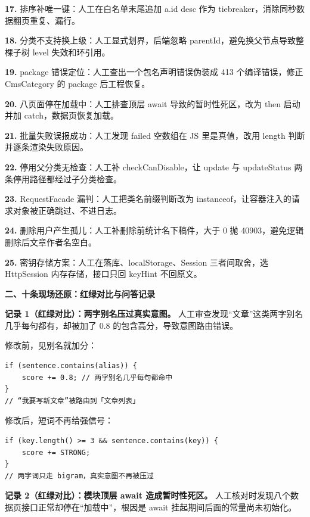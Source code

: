 \documentclass[zihao=-4,UTF8,openany]{ctexart}
\renewcommand{\_}{\textunderscore\allowbreak}
\begin{document}
\noindent\textbf{17.} 排序补唯一键：人工在白名单末尾追加 a.id desc 作为 tiebreaker，消除同秒数据翻页重复、漏行。

\noindent\textbf{18.} 分类不支持换上级：人工显式划界，后端忽略 parentId，避免换父节点导致整棵子树 level 失效和环引用。

\noindent\textbf{19.} package 错误定位：人工查出一个包名声明错误伪装成 413 个编译错误，修正 CmsCategory 的 package 后工程恢复。

\noindent\textbf{20.} 八页面停在加载中：人工排查顶层 await 导致的暂时性死区，改为 then 启动并加 catch，数据页恢复加载。

\noindent\textbf{21.} 批量失败误报成功：人工发现 failed 空数组在 JS 里是真值，改用 length 判断并逐条渲染失败原因。

\noindent\textbf{22.} 停用父分类无检查：人工补 checkCanDisable，让 update 与 updateStatus 两条停用路径都经过子分类检查。

\noindent\textbf{23.} RequestFacade 漏判：人工把类名前缀判断改为 instanceof，让容器注入的请求对象被正确跳过、不进日志。

\noindent\textbf{24.} 删除用户产生孤儿：人工补删除前统计名下稿件，大于 0 抛 40903，避免逻辑删除后文章作者名空白。

\noindent\textbf{25.} 密钥存储方案：人工在落库、localStorage、Session 三者间取舍，选 HttpSession 内存存储，接口只回 keyHint 不回原文。

\noindent\textbf{二、十条现场还原：红绿对比与问答记录}

\noindent\textbf{记录 1（红绿对比）：两字别名压过真实意图。} 人工审查发现“文章”这类两字别名几乎每句都有，却被加了 0.8 的包含高分，导致意图路由错误。

修改前，见别名就加分：

\begin{lstlisting}[style=fixBefore]
if (sentence.contains(alias)) {
    score += 0.8; // 两字别名几乎每句都命中
}
// “我要写新文章”被路由到「文章列表」
\end{lstlisting}

修改后，短词不再给强信号：

\begin{lstlisting}[style=fixAfter]
if (key.length() >= 3 && sentence.contains(key)) {
    score += STRONG;
}
// 两字词只走 bigram，真实意图不再被压过
\end{lstlisting}

\noindent\textbf{记录 2（红绿对比）：模块顶层 await 造成暂时性死区。} 人工核对时发现八个数据页接口正常却停在“加载中”，根因是 await 挂起期间后面的常量尚未初始化。
\end{document}
